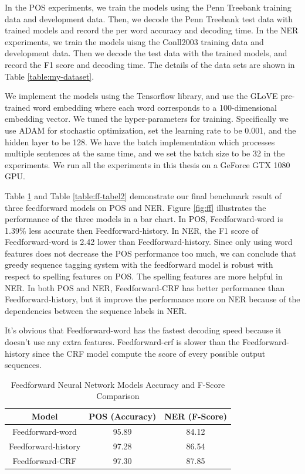 \documentclass{sfuthesis}
\begin{document}
In the POS experiments, we train the models using the Penn Treebank training data and development data. Then, we decode the Penn Treebank test data with trained models and record the per word accuracy and decoding time. In the NER experiments, we train the models uisng the Conll2003 training data and development data. Then we decode the test data with the trained models, and record the F1 score and decoding time. The details of the data sets are shown in Table \ref{table:my-dataset}.

 
We implement the models using the Tensorflow library, and use the GLoVE pre-trained word embedding where each word corresponds to a 100-dimensional embedding vector. We tuned the hyper-parameters for training. Specifically we use ADAM for stochastic optimization, set the learning rate to be 0.001, and the hidden layer to be 128. We have the batch implementation which processes multiple sentences at the same time, and we set the batch size to be 32 in the experiments. We run all the experiments in this thesis on a GeForce GTX 1080 GPU. 

Table \ref{table:ff-table1} and Table \ref{table:ff-tabel2} demonstrate our final benchmark result of three feedforward models on POS and NER. Figure \ref{fig:ff} illustrates the performance of the three models in a bar chart. In POS, Feedforward-word is 1.39\% less accurate then Feedforward-history. In NER, the F1 score of Feedforward-word is 2.42 lower than Feedforward-history. Since only using word features does not decrease the POS performance too much, we can conclude that greedy sequence tagging system with the feedforward model is robust with respect to spelling features on POS. The spelling features are more helpful in NER. In both POS and NER, Feedforward-CRF has better performance than Feedforward-history, but it improve the performance more on NER because of the dependencies between the sequence labels in NER.

It's obvious that Feedforward-word has the fastest decoding speed because it doesn't use any extra features. Feedforward-crf is slower than the Feedforward-history since the CRF model compute the score of every possible output sequences.

\begin{table}[]
\centering
\caption{Feedforward Neural Network Models Accuracy and F-Score Comparison}
\label{table:ff-table1}
\begin{tabular}{|c|c|c|}
\hline
Model         & POS (Accuracy)  & NER (F-Score)       \\ \hline
Feedforward-word    & 95.89          &   84.12     \\ \hline
Feedforward-history & 97.28     & 86.54        \\ \hline
Feedforward-CRF     & 97.30          &   87.85     \\ \hline
\end{tabular}
\end{table}
\end{document}
